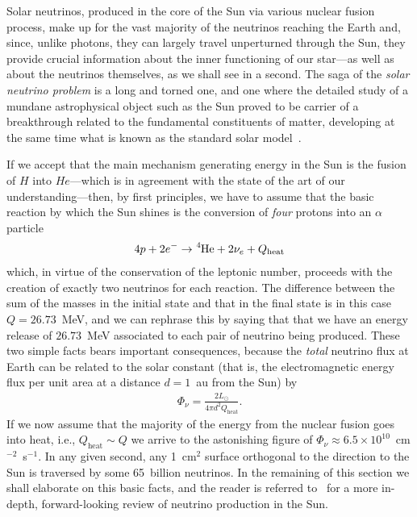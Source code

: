 Solar neutrinos, produced in the core of the Sun via various nuclear fusion process,
make up for the vast majority of the neutrinos reaching the Earth and, since, unlike
photons, they can largely travel unperturned through the Sun, they provide crucial
information about the inner functioning of our star---as well as about the neutrinos
themselves, as we shall see in a second. The saga of the \emph{solar neutrino problem}
is a long and torned one, and one where the detailed study of a mundane astrophysical
object such as the Sun proved to be carrier of a breakthrough related to the fundamental
constituents of matter, developing at the same time what is known as the standard
solar model~\cite{2003nipb.conf...15B}.

If we accept that the main mechanism generating energy in the Sun is the fusion
of $H$ into $He$---which is in agreement with the state of the art of our
understanding---then, by first principles, we have to assume that the basic reaction
by which the Sun shines is the conversion of \emph{four} protons into an $\alpha$
particle
\begin{align*}
  4p + 2 e^- \rightarrow \ce{^4He} + 2\nu_e + Q_\text{heat}
\end{align*}
which, in virtue of the conservation of the leptonic number, proceeds with the
creation of exactly two neutrinos for each reaction.
The difference between the sum of the masses in the initial state and that in the
final state is in this case $Q = 26.73$~MeV, and we can rephrase this by saying
that that we have an energy release of $26.73$~MeV associated to each pair of
neutrino being produced. These two simple facts bears important consequences,
because the \emph{total} neutrino flux at Earth can be related to the solar
constant (that is, the electromagnetic energy flux per unit
area at a distance $d = 1$~au from the Sun) by
\begin{align}
  \Phi_\nu = \frac{2 L_\odot}{4\pi d^2 Q_\text{heat}}.
\end{align}
If we now assume that the majority of the energy from the nuclear fusion goes into
heat, i.e., $Q_\text{heat} \sim Q$ we arrive to the astonishing figure of
$\Phi_\nu \approx 6.5 \times 10^{10}$~cm$^{-2}$~s$^{-1}$. In any given second, any
1~cm$^2$ surface orthogonal to the direction to the Sun is traversed by some
65~billion neutrinos. In the remaining of this section we shall elaborate on this
basic facts, and the reader is referred to~\cite{2021ARNPS..71..491O} for a more
in-depth, forward-looking review of neutrino production in the Sun.


